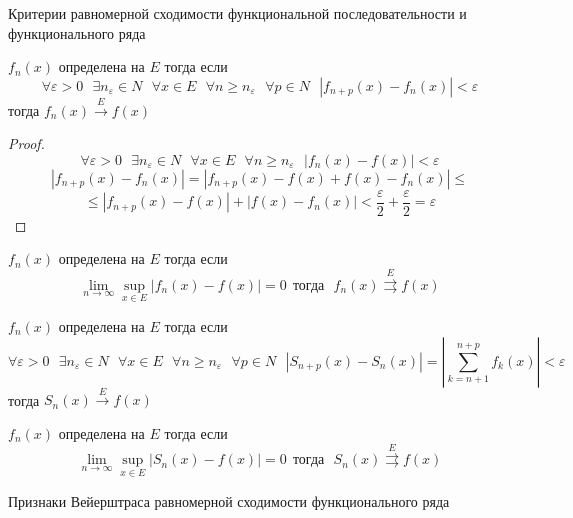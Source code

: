 \begin{title}[\Large]
  Критерии равномерной сходимости функциональной последовательности и
  функционального ряда
\end{title}

\begin{block}
  $f_n(x)$ определена на $E$ тогда если
  $$
  \forall \varepsilon > 0 ~~~ \exists n_{\varepsilon} \in N ~~~
  \forall x \in E ~~~ \forall n \ge n_{\varepsilon} ~~~ \forall p \in N ~~~
  |f_{n+p}(x) - f_n(x)| < \varepsilon
  $$
  тогда $f_n(x) \stackrel{E}{\rightarrow} f(x)$
\end{block}

\begin{proof}
  $$
  \forall \varepsilon > 0 ~~~ \exists n_{\varepsilon} \in N ~~~
  \forall x \in E ~~~ \forall n \ge n_{\varepsilon} ~~~
  |f_n(x) - f(x)| < \varepsilon
  $$
  $$
  |f_{n+p}(x) - f_n(x)| = |f_{n+p}(x) - f(x) + f(x) - f_n(x)| \le
  $$
  $$
  \le |f_{n+p}(x) - f(x)| + |f(x) - f_n(x)| < \frac{\varepsilon}{2} +
  \frac{\varepsilon}{2} = \varepsilon
  $$
\end{proof}

\begin{block}
  $f_n(x)$ определена на $E$ тогда если
  $$
  \lim_{n \to \infty} \sup\limits_{x \in E} |f_n(x) - f(x)| = 0 ~~ \text{тогда}
  ~~~ f_n(x) \stackrel{E}{\rightrightarrows} f(x)
  $$
\end{block}

\begin{block}
  $f_n(x)$ определена на $E$ тогда если
  $$
  \forall \varepsilon > 0 ~~~ \exists n_{\varepsilon} \in N ~~~
  \forall x \in E ~~~ \forall n \ge n_{\varepsilon} ~~~ \forall p \in N ~~~
  |S_{n+p}(x) - S_n(x)| = \left| \sum_{k = n + 1}^{n+p} f_k(x) \right|
  < \varepsilon
  $$
  тогда $S_n(x) \stackrel{E}{\rightarrow} f(x)$
\end{block}

\begin{block}
  $f_n(x)$ определена на $E$ тогда если
  $$
  \lim_{n \to \infty} \sup\limits_{x \in E} |S_n(x) - f(x)| = 0 ~~ \text{тогда}
  ~~~ S_n(x) \stackrel{E}{\rightrightarrows} f(x)
  $$
\end{block}

\begin{title}[\Large]
  Признаки Вейерштраса равномерной сходимости функционального ряда
\end{title}

